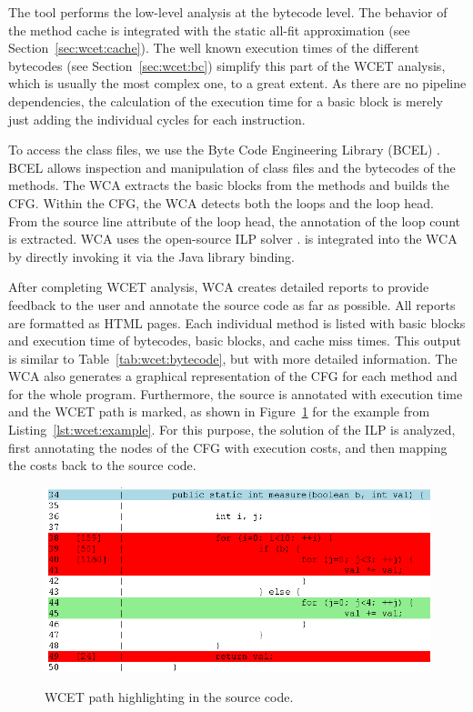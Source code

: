 The tool performs the low-level analysis at the bytecode level. The
behavior of the method cache is integrated with the static all-fit
approximation (see Section~\ref{sec:wcet:cache}). The well known
execution times of the different bytecodes (see
Section~\ref{sec:wcet:bc}) simplify this part of the WCET analysis,
which is usually the most complex one, to a great extent. As there
are no pipeline dependencies, the calculation of the execution time
for a basic block is merely just adding the individual cycles for
each instruction.

To access the class files, we use the Byte Code Engineering Library
(BCEL) \cite{gc:bcel}. BCEL allows inspection and manipulation of
class files and the bytecodes of the methods. The WCA extracts the
basic blocks from the methods and builds the CFG. Within the CFG, the
WCA detects both the loops and the loop head. From the source line
attribute of the loop head, the annotation of the loop count is
extracted. WCA uses the open-source ILP solver .
 is integrated into the WCA by directly invoking it
via the Java library binding.

After completing WCET analysis, WCA creates detailed reports to
provide feedback to the user and annotate the source code as far as
possible. All reports are formatted as HTML pages. Each individual
method is listed with basic blocks and execution time of bytecodes,
basic blocks, and cache miss times. This output is similar to
Table~\ref{tab:wcet:bytecode}, but with more detailed information.
The WCA also generates a graphical representation of the CFG for each
method and for the whole program. Furthermore, the source is
annotated with execution time and the WCET path is marked, as shown
in Figure~\ref{fig:report} for the example from
Listing~\ref{lst:wcet:example}. For this purpose, the solution of the
ILP is analyzed, first annotating the nodes of the CFG with execution
costs, and then mapping the costs back to the source code.


\begin{figure}[t]
  \centering
  \includegraphics[scale=0.5]{wcet/html}\\
  \caption{WCET path highlighting in the source code.}\label{fig:report}
\end{figure}

